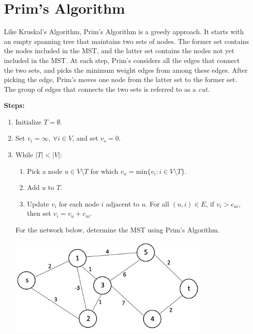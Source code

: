 \documentclass[12pt]{article}
\theoremstyle{definition}
\begin{document}
\newpage
\section{Prim's Algorithm}

Like Kruskal's Algorithm, Prim's Algorithm is a greedy approach. It starts with an empty spanning tree that maintains two sets of nodes. The former set contains the nodes included in the MST, and the latter set contains the nodes not yet included in the MST. At each step, Prim's considers all the edges that connect the two sets, and picks the minimum weight edges from among these edges. After picking the edge, Prim's moves one node from the latter set to the former set. The group of edges that connects the two sets is referred to as a \emph{cut}. 

\textbf{Steps:}

\begin{enumerate}

	\item Initialize $T = \emptyset$.
	\item Set $v_i = \infty, \ \forall i \in V$, and set $v_s = 0$.
	\item While $|T| < |V|$:
	\begin{enumerate}
		\item Pick a node $u \in V \setminus T$ for which $v_u = \textrm{min}\{v_i: i \in V \setminus T \}$.
		\item Add $u$ to $T$.
		\item Update $v_i$ for each node $i$ adjacent to $u$. For all $(u,i) \in E$, if $v_i > c_{ui}$, then set $v_i = v_u + c_{ui}$.
	\end{enumerate}
For the network below, determine the MST using Prim's Algorithm.

\begin{center}
\includegraphics[width=10cm]{minspanningtree}
\end{center}


\newpage

\end{enumerate}
\end{document}
